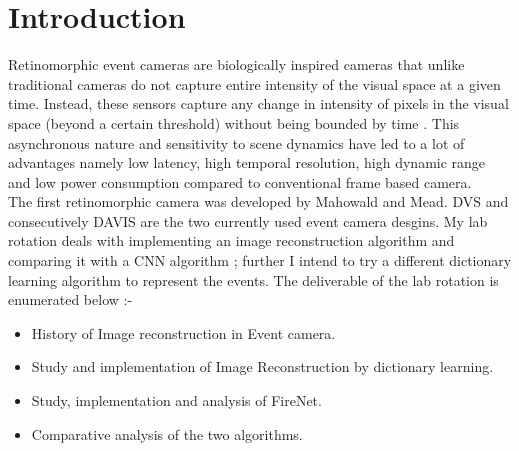 \section{Introduction}

Retinomorphic event cameras are biologically inspired cameras that unlike traditional cameras do not capture entire intensity of the visual space at a given time. Instead, these sensors capture any change in intensity of pixels in the visual space (beyond a certain threshold) without being bounded by time \cite{boahen2005neuromorphic}. This asynchronous nature and sensitivity to scene dynamics have led to a lot of advantages namely low latency, high temporal resolution, high dynamic range and low power consumption compared to conventional frame based camera.\\

The first retinomorphic camera was developed by Mahowald and Mead. DVS and consecutively DAVIS are the two currently used event camera desgins.  
 My lab rotation deals with implementing an image reconstruction algorithm and comparing it with a CNN algorithm ; further I intend to try a different dictionary learning algorithm to represent the events. The deliverable of the lab rotation is enumerated below :-

\begin{itemize}
  \item History of Image reconstruction in Event camera.
  \item Study and implementation of Image Reconstruction by dictionary learning. \cite{barua2016direct}
  \item Study, implementation and analysis of FireNet.\cite{scheerlinck2020fast}
  \item Comparative analysis of the two algorithms.
\end{itemize}